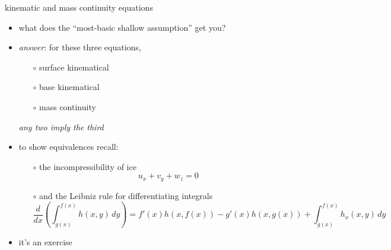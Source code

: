 \begin{frame}{kinematic and mass continuity equations}

\begin{itemize}
\item what does the ``most-basic shallow assumption'' get you?
\item \emph{answer}: for these three equations,
  \begin{itemize}
  \item[$\circ$]  surface kinematical
  \item[$\circ$]  base kinematical
  \item[$\circ$]  mass continuity
  \end{itemize}
\emph{any two imply the third}

\bigskip
\item to show equivalences recall:
  \begin{itemize}
  \item[$\circ$]  the incompressibility of ice
    $$u_x + v_y + w_z = 0$$
  \item[$\circ$]  and the Leibniz rule for differentiating integrals
  \scriptsize
    $$\frac{d}{dx}\left(\int_{g(x)}^{f(x)} h(x,y)\,dy\right) = f'(x) h(x,f(x)) - g'(x) h(x,g(x)) + \int_{g(x)}^{f(x)} h_x(x,y)\,dy$$
  \end{itemize}
\item it's an exercise
\end{itemize}
\end{frame}


